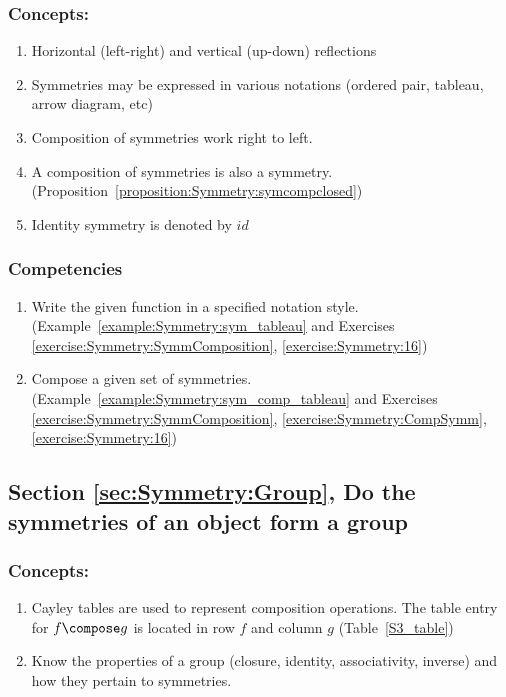 \subsubsection*{Concepts:}
\begin{enumerate}
\item
Horizontal (left-right) and vertical (up-down) reflections
\item
Symmetries may be expressed in various notations (ordered pair, tableau, arrow diagram, etc)
\item
Composition of symmetries work right to left.
\item
A composition of symmetries is also a symmetry. (Proposition~\ref{proposition:Symmetry:symcompclosed})
\item
Identity symmetry is denoted by $id$
\end{enumerate}

\subsubsection*{Competencies}
\begin{enumerate}
\item
Write the given function in a specified notation style. (Example~\ref{example:Symmetry:sym_tableau} and Exercises \ref{exercise:Symmetry:SymmComposition}, \ref{exercise:Symmetry:16})
\item
Compose a given set of symmetries. (Example~\ref{example:Symmetry:sym_comp_tableau} and Exercises \ref{exercise:Symmetry:SymmComposition}, \ref{exercise:Symmetry:CompSymm},  \ref{exercise:Symmetry:16})
\end{enumerate}


\subsection*{Section \ref{sec:Symmetry:Group}, Do the symmetries of an object form a group}
\subsubsection*{Concepts:}
\begin{enumerate}
\item 
Cayley tables are used to represent composition operations. The table entry for $f \compose g$ is located in row $f$ and column $g$ (Table~\ref{S3_table})
\item
Know the properties of a group (closure, identity, associativity, inverse) and how they pertain to symmetries.  
\end{enumerate}

